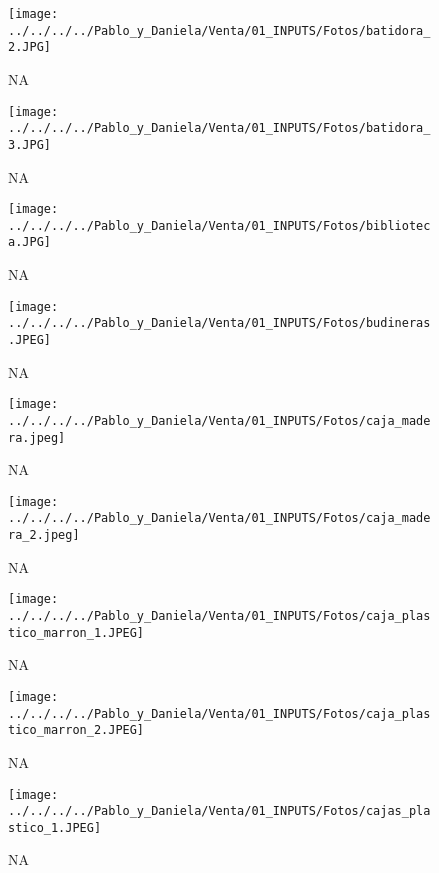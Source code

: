 \documentclass[
]{article}
\begin{document}
\pagebreak

\begin{figure}
\centering
\texttt{[image: ../../../../Pablo\_y\_Daniela/Venta/01\_INPUTS/Fotos/batidora\_2.JPG]}
\caption{NA}
\end{figure}

\pagebreak

\begin{figure}
\centering
\texttt{[image: ../../../../Pablo\_y\_Daniela/Venta/01\_INPUTS/Fotos/batidora\_3.JPG]}
\caption{NA}
\end{figure}

\pagebreak

\begin{figure}
\centering
\texttt{[image: ../../../../Pablo\_y\_Daniela/Venta/01\_INPUTS/Fotos/biblioteca.JPG]}
\caption{NA}
\end{figure}

\pagebreak

\begin{figure}
\centering
\texttt{[image: ../../../../Pablo\_y\_Daniela/Venta/01\_INPUTS/Fotos/budineras.JPEG]}
\caption{NA}
\end{figure}

\pagebreak

\begin{figure}
\centering
\texttt{[image: ../../../../Pablo\_y\_Daniela/Venta/01\_INPUTS/Fotos/caja\_madera.jpeg]}
\caption{NA}
\end{figure}

\pagebreak

\begin{figure}
\centering
\texttt{[image: ../../../../Pablo\_y\_Daniela/Venta/01\_INPUTS/Fotos/caja\_madera\_2.jpeg]}
\caption{NA}
\end{figure}

\pagebreak

\begin{figure}
\centering
\texttt{[image: ../../../../Pablo\_y\_Daniela/Venta/01\_INPUTS/Fotos/caja\_plastico\_marron\_1.JPEG]}
\caption{NA}
\end{figure}

\pagebreak

\begin{figure}
\centering
\texttt{[image: ../../../../Pablo\_y\_Daniela/Venta/01\_INPUTS/Fotos/caja\_plastico\_marron\_2.JPEG]}
\caption{NA}
\end{figure}

\pagebreak

\begin{figure}
\centering
\texttt{[image: ../../../../Pablo\_y\_Daniela/Venta/01\_INPUTS/Fotos/cajas\_plastico\_1.JPEG]}
\caption{NA}
\end{figure}
\end{document}
